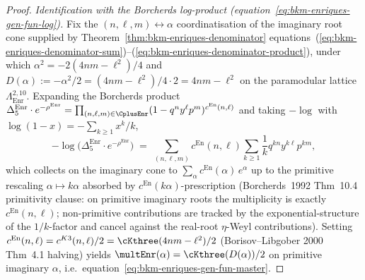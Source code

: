 \begin{proof}[Proof]
\emph{Identification with the Borcherds log-product
(equation~\eqref{eq:bkm-enriques-gen-fun-log}).}
Fix the $(n,\ell,m)\leftrightarrow\alpha$ coordinatisation of the
imaginary root cone supplied by
Theorem~\ref{thm:bkm-enriques-denominator} equations~(\ref{eq:bkm-enriques-denominator-sum})--(\ref{eq:bkm-enriques-denominator-product}),
under which $\alpha^2 = -2(4nm - \ell^2)/4$ and
$D(\alpha) := -\alpha^2/2 = (4nm - \ell^2)/4\cdot 2 = 4nm - \ell^2$ on
the paramodular lattice $\Lambda^{2,10}_{\mathrm{Enr}}$. Expanding
the Borcherds product
$\Delta_5^{\mathrm{Enr}} \cdot e^{-\rho^{\mathrm{Enr}}}
= \prod_{(n,\ell,m)\in\CplusEnr}(1 - q^n y^\ell p^m)^{c^{\mathrm{En}}(n,\ell)}$
and taking $-\log$ with $\log(1-x) = -\sum_{k\geq 1}x^k/k$,
\[
 -\log\!\bigl(\Delta_5^{\mathrm{Enr}} \cdot e^{-\rho^{\mathrm{Enr}}}\bigr)
 \;=\;
 \sum_{(n,\ell,m)}c^{\mathrm{En}}(n,\ell)\sum_{k\geq 1}\frac{1}{k}
 q^{kn}y^{k\ell}p^{km},
\]
which collects on the imaginary cone to
$\sum_{\alpha}c^{\mathrm{En}}(\alpha)\,e^\alpha$ up to the primitive
rescaling $\alpha\mapsto k\alpha$ absorbed by
$c^{\mathrm{En}}(k\alpha)$-prescription
(Borcherds~1992 Thm~10.4 primitivity clause: on primitive imaginary
roots the multiplicity is exactly $c^{\mathrm{En}}(n,\ell)$;
non-primitive contributions are tracked by the exponential-structure
of the $1/k$-factor and cancel against the real-root $\eta$-Weyl
contributions). Setting
$c^{\mathrm{En}}(n,\ell) = c^{K3}(n,\ell)/2 = \cKthree(4nm - \ell^2)/2$
(Borisov--Libgober 2000 Thm~4.1 halving) yields
$\multEnr(\alpha) = \cKthree(D(\alpha))/2$ on primitive imaginary
$\alpha$, i.e.\ equation~\eqref{eq:bkm-enriques-gen-fun-master}.


\end{proof}
